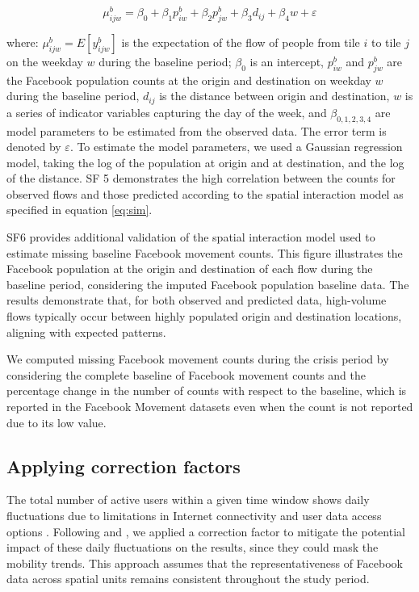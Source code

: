 \documentclass[fleqn,10pt]{wlscirep}
\begin{document}
\begin{equation}\label{eq:sim}
\mu^b_{ijw} = \beta_0 + \beta_1p^b_{iw} +\beta_2p^b_{jw} + \beta_3d_{ij} + \beta_4w + \varepsilon
\end{equation}

where: $\mu^b_{ijw} = E[y^b_{ijw}]$ is the expectation of the flow of people from tile $i$ to tile $j$ on the weekday $w$ during the baseline period; $\beta_0$ is an intercept, $p^b_{iw}$ and $p^b_{jw}$ are the Facebook population counts at the origin and destination on weekday $w$ during the baseline period, $d_{ij}$ is the distance between origin and destination, $w$ is a series of indicator variables capturing the day of the week, and $\beta_{0,1,2,3,4}$ are model parameters to be estimated from the observed data.
The error term is denoted by $\varepsilon$.
To estimate the model parameters, we used a Gaussian regression model, taking the log of the population at origin and at destination, and the log of the distance. SF 5 demonstrates the high correlation between the counts for observed flows and those predicted according to the spatial interaction model as specified in equation \eqref{eq:sim}.

SF6 provides additional validation of the spatial interaction model used to estimate missing baseline Facebook movement counts. This figure illustrates the Facebook population at the origin and destination of each flow during the baseline period, considering the imputed Facebook population baseline data. The results demonstrate that, for both observed and predicted data, high-volume flows typically occur between highly populated origin and destination locations, aligning with expected patterns.

We computed missing Facebook movement counts during the crisis period by considering the complete baseline of Facebook movement counts and the percentage change in the number of counts with respect to the baseline, which is reported in the Facebook Movement datasets even when the count is not reported due to its low value.

\subsection*{ Applying correction factors}

The total number of active users within a given time window shows daily fluctuations due to limitations in Internet connectivity and user data access options \cite{Maas19}.
Following \cite{yabe2020} and \cite{duan2024}, we applied a correction factor to mitigate the potential impact of these daily fluctuations on the results, since they could mask the mobility trends.
This approach assumes that the representativeness of Facebook data across spatial units remains consistent throughout the study period.
\end{document}
